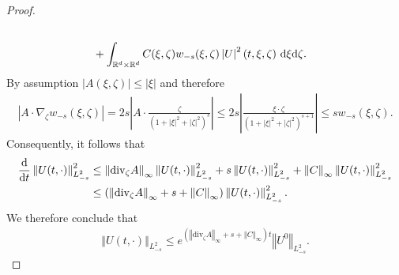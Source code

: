 \documentclass[11pt,reqno]{amsart}
\numberwithin{equation}{section}
\def\dd{{\rm d}}
\begin{document}
\begin{proof}
\begin{align*}
\\
&+\int_{\mathbb{R}^{d}\times \mathbb{R}^{d}}C(\xi,\zeta)w_{-s}(\xi,\zeta)\left\vert U\right\vert^{2}(t,\xi,\zeta)\ \dd \xi\dd \zeta.   
\end{align*}
By assumption $\left\vert A(\xi,\zeta)\right\vert\leq \left\vert \xi\right\vert$ and therefore  
\begin{align*}
\left\vert A\cdot \nabla_{\zeta}w_{-s}(\xi,\zeta)\right\vert =2s\left\vert A\cdot \frac{\zeta}{(1+\left\vert \xi\right\vert^{2}+\left\vert \zeta\right\vert^{2})^{s}}\right\vert \leq 2s\left\vert \frac{\xi\cdot \zeta}{(1+\left\vert \xi\right\vert^{2}+\left\vert \zeta\right\vert^{2})^{s+1} }\right\vert\leq sw_{-s}(\xi,\zeta).      
\end{align*}
Consequently, it follows that 
\begin{align}
\frac{\dd}{\dd t}\left\Vert U(t,\cdot)\right\Vert_{L^{2}_{-s}}^{2}&\leq \left\Vert \mathrm{div}_{\zeta}A\right\Vert_{\infty} \left\Vert U(t,\cdot)\right\Vert_{L^{2}_{-s}}^{2} +s\left\Vert U(t,\cdot)\right\Vert_{L^{2}_{-s}}^{2} 
+\left\Vert C\right\Vert_{\infty}\left\Vert U(t,\cdot)\right\Vert_{L^{2}_{-s}}^
{2} \notag\\
&\leq (\left\Vert \mathrm{div}_{\zeta}A\right\Vert_{\infty} +s+\left\Vert C\right\Vert_{\infty})\left\Vert U(t,\cdot)\right\Vert_{L^{2}_{-s}}^{2}. \label{first gronwall type} \end{align}
We therefore conclude that 
\begin{align*}
\left\Vert U(t,\cdot)\right\Vert_{L^{2}_{-s}}\leq e^{(\left\Vert \mathrm{div}_{\zeta}A\right\Vert_{\infty}+s+\left\Vert C\right\Vert_{\infty})t}\left\Vert U^{0}\right\Vert_{L^{2}_{-s}}.       
\end{align*}
\end{proof}
\end{document}
